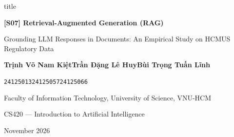 \begin{frame}[plain]
  \vspace{0.6cm}
  \begin{center}
    \begin{beamercolorbox}[sep=8pt,center,rounded=true,shadow=false,wd=0.96\textwidth]{title}
      {\LARGE\bfseries [S07] Retrieval-Augmented Generation (RAG)\par}
      \vspace{2pt}
      {\small Grounding LLM Responses in Documents: An Empirical Study on HCMUS Regulatory Data\par}
    \end{beamercolorbox}
    
    \vspace{0.7cm}
    {\normalsize\textbf{Trịnh Võ Nam Kiệt}\quad\textperiodcentered\quad\textbf{Trần Đặng Lê Huy}\quad\textperiodcentered\quad\textbf{Bùi Trọng Tuấn Lĩnh}\par}
    \vspace{2pt}
    {\footnotesize\texttt{24125013}\qquad\qquad\qquad\texttt{24125057}\qquad\qquad\qquad\texttt{24125066}\par}
    
    \vspace{0.5cm}
    {\footnotesize Faculty of Information Technology, University of Science, VNU-HCM\par}
    {\footnotesize CS420 --- Introduction to Artificial Intelligence\par}
    
    \vspace{0.4cm}
    {\scriptsize November 2026\par}
  \end{center}
\end{frame}
